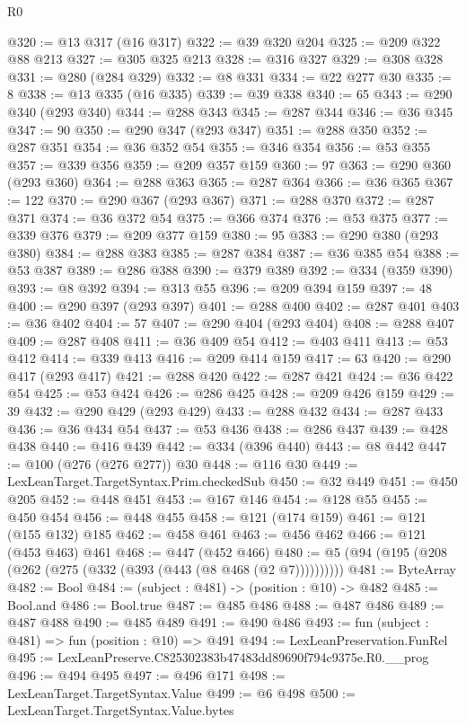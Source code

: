\begin{lexlean}{R0}
\begin{coremodule}
@320 := @13 @317 (@16 @317)
@322 := @39 @320 @204
@325 := @209 @322 @88 @213
@327 := @305 @325 @213
@328 := @316 @327
@329 := @308 @328
@331 := @280 (@284 @329)
@332 := @8 @331
@334 := @22 @277 @30
@335 := 8
@338 := @13 @335 (@16 @335)
@339 := @39 @338
@340 := 65
@343 := @290 @340 (@293 @340)
@344 := @288 @343
@345 := @287 @344
@346 := @36 @345
@347 := 90
@350 := @290 @347 (@293 @347)
@351 := @288 @350
@352 := @287 @351
@354 := @36 @352 @54
@355 := @346 @354
@356 := @53 @355
@357 := @339 @356
@359 := @209 @357 @159
@360 := 97
@363 := @290 @360 (@293 @360)
@364 := @288 @363
@365 := @287 @364
@366 := @36 @365
@367 := 122
@370 := @290 @367 (@293 @367)
@371 := @288 @370
@372 := @287 @371
@374 := @36 @372 @54
@375 := @366 @374
@376 := @53 @375
@377 := @339 @376
@379 := @209 @377 @159
@380 := 95
@383 := @290 @380 (@293 @380)
@384 := @288 @383
@385 := @287 @384
@387 := @36 @385 @54
@388 := @53 @387
@389 := @286 @388
@390 := @379 @389
@392 := @334 (@359 @390)
@393 := @8 @392
@394 := @313 @55
@396 := @209 @394 @159
@397 := 48
@400 := @290 @397 (@293 @397)
@401 := @288 @400
@402 := @287 @401
@403 := @36 @402
@404 := 57
@407 := @290 @404 (@293 @404)
@408 := @288 @407
@409 := @287 @408
@411 := @36 @409 @54
@412 := @403 @411
@413 := @53 @412
@414 := @339 @413
@416 := @209 @414 @159
@417 := 63
@420 := @290 @417 (@293 @417)
@421 := @288 @420
@422 := @287 @421
@424 := @36 @422 @54
@425 := @53 @424
@426 := @286 @425
@428 := @209 @426 @159
@429 := 39
@432 := @290 @429 (@293 @429)
@433 := @288 @432
@434 := @287 @433
@436 := @36 @434 @54
@437 := @53 @436
@438 := @286 @437
@439 := @428 @438
@440 := @416 @439
@442 := @334 (@396 @440)
@443 := @8 @442
@447 := @100 (@276 (@276 @277)) @30
@448 := @116 @30
@449 := LexLeanTarget.TargetSyntax.Prim.checkedSub
@450 := @32 @449
@451 := @450 @205
@452 := @448 @451
@453 := @167 @146
@454 := @128 @55
@455 := @450 @454
@456 := @448 @455
@458 := @121 (@174 @159)
@461 := @121 (@155 @132) @185
@462 := @458 @461
@463 := @456 @462
@466 := @121 (@453 @463) @461
@468 := @447 (@452 @466)
@480 := @5 (@94 (@195 (@208 (@262 (@275 (@332 (@393 (@443 (@8 @468 (@2 @7))))))))))
@481 := ByteArray
@482 := Bool
@484 := (subject : @481) -> (position : @10) -> @482
@485 := Bool.and
@486 := Bool.true
@487 := @485 @486
@488 := @487 @486
@489 := @487 @488
@490 := @485 @489
@491 := @490 @486
@493 := fun (subject : @481) => fun (position : @10) => @491
@494 := LexLeanPreservation.FunRel
@495 := LexLeanPreserve.C825302383b47483dd89690f794c9375e.R0.__prog
@496 := @494 @495
@497 := @496 @171
@498 := LexLeanTarget.TargetSyntax.Value
@499 := @6 @498
@500 := LexLeanTarget.TargetSyntax.Value.bytes

\end{coremodule}
\end{lexlean}
